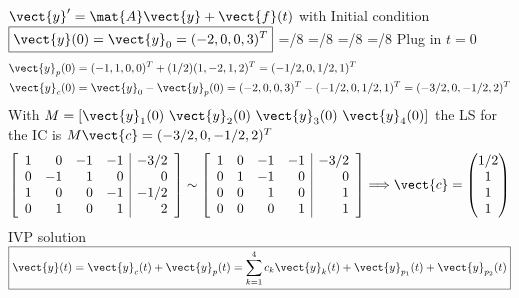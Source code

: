 \begin{frame}{$\vect{y}'=\mat{A}\vect{y}+\vect{f}(t)$
	with 
	Initial condition \quad 
	$\boxed{\vect{y}(0)=\vect{y}_0=(-2,0,0,3)^T}$}
\abovedisplayskip=\glueexpr{}/8\relax
\belowdisplayskip=\glueexpr{}/8\relax
\abovedisplayshortskip=\glueexpr{}/8\relax
\belowdisplayshortskip=\glueexpr{}/8\relax
Plug in $t=0$
\[
  \begin{aligned}
    \vect{y}_p(0)&=(-1,1,0,0)^T+(1/2)(1,-2,1,2)^T=(-1/2,0,1/2,1)^T\\
    \vect{y}_c(0)&=\vect{y}_0-\vect{y}_p(0)
    =(-2,0,0,3)^T-(-1/2,0,1/2,1)^T=(-3/2,0,-1/2,2)^T
  \end{aligned}
\]
With 
$M=[\vect{y}_1(0)\ \vect{y}_2(0)\ \vect{y}_3(0)\ \vect{y}_4(0)]$ 
the LS for the IC is $M\vect{c}=(-3/2,0,-1/2,2)^T$
\[
  \left[\begin{array}{rrrr|r}
    1&0&-1&-1&-3/2\\0&-1&1&0&0\\1&0&0&-1&-1/2\\0&1&0&1&2
  \end{array}\right]
  \sim
  \left[\begin{array}{rrrr|r}
    1&0&-1&-1&-3/2\\0&1&-1&0&0\\0&0&1&0&1\\0&0&0&1&1
  \end{array}\right]
  \Longrightarrow
  \vect{c}=\begin{pmatrix}1/2\\1\\1\\1\end{pmatrix}
\]
IVP solution\quad
$\displaystyle
\boxed{\vect{y}(t)=\vect{y}_c(t)+\vect{y}_p(t)=\sum_{k=1}^{4}c_k\vect{y}_k(t)+\vect{y}_{p_1}(t)+\vect{y}_{p_2}(t)}$
\end{frame}
